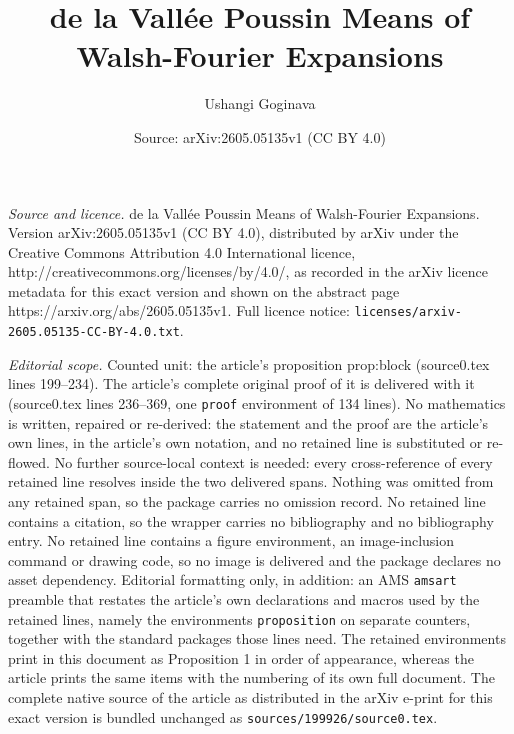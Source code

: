 \documentclass[10pt,a4paper]{amsart}
\title{de la Vall\'ee Poussin Means of Walsh-Fourier Expansions}
\author{Ushangi Goginava}
\date{Source: arXiv:2605.05135v1 (CC BY 4.0)}
\begin{document}
\maketitle

\noindent\emph{Source and licence.} de la Vall\'ee Poussin Means of Walsh-Fourier Expansions. Version arXiv:2605.05135v1 (CC BY 4.0), distributed by arXiv under the Creative Commons Attribution 4.0 International licence, http://creativecommons.org/licenses/by/4.0/, as recorded in the arXiv licence metadata for this exact version and shown on the abstract page https://arxiv.org/abs/2605.05135v1. Full licence notice: \texttt{licenses/arxiv-2605.05135-CC-BY-4.0.txt}.\par\smallskip

\noindent\textit{Editorial scope.} Counted unit: the article's proposition prop:block (source0.tex lines 199--234). The article's complete original proof of it is delivered with it (source0.tex lines 236--369, one \texttt{proof} environment of 134 lines). No mathematics is written, repaired or re-derived: the statement and the proof are the article's own lines, in the article's own notation, and no retained line is substituted or re-flowed.  No further source-local context is needed: every cross-reference of every retained line resolves inside the two delivered spans.  Nothing was omitted from any retained span, so the package carries no omission record.  No retained line contains a citation, so the wrapper carries no bibliography and no bibliography entry.  No retained line contains a figure environment, an image-inclusion command or drawing code, so no image is delivered and the package declares no asset dependency.  Editorial formatting only, in addition: an AMS \texttt{amsart} preamble that restates the article's own declarations and macros used by the retained lines, namely the environments \texttt{proposition} on separate counters, together with the standard packages those lines need.  The retained environments print in this document as Proposition 1 in order of appearance, whereas the article prints the same items with the numbering of its own full document.  The complete native source of the article as distributed in the arXiv e-print for this exact version is bundled unchanged as \texttt{sources/199926/source0.tex}.
\end{document}
